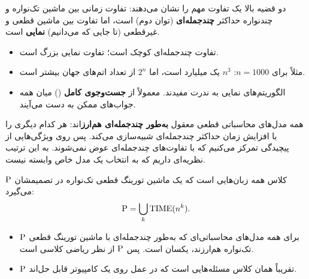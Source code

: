 دو قضیه بالا یک تفاوت مهم را نشان می‌دهند: تفاوت زمانی بین ماشین تک‌نواره و چندنواره حداکثر \textbf{چندجمله‌ای} (توان دوم) است، اما تفاوت بین ماشین قطعی و غیرقطعی (تا جایی که می‌دانیم) \textbf{نمایی} است.

\begin{itemize}
\item تفاوت چندجمله‌ای کوچک است؛ تفاوت نمایی بزرگ است.
\item مثلاً برای $n=1000$: $n^3$ یک میلیارد است، اما $2^n$ از تعداد اتم‌های جهان بیشتر است.
\item الگوریتم‌های نمایی به ندرت مفیدند. معمولاً از \textbf{جست‌وجوی کامل} () میان همه جواب‌های ممکن به دست می‌آیند.
\end{itemize}

همه مدل‌های محاسباتی قطعی معقول \textbf{به‌طور چندجمله‌ای هم‌ارز}اند: هر کدام دیگری را با افزایش زمان حداکثر چندجمله‌ای شبیه‌سازی می‌کند. پس روی ویژگی‌هایی از پیچیدگی تمرکز می‌کنیم که با تفاوت‌های چندجمله‌ای عوض نمی‌شوند. به این ترتیب نظریه‌ای داریم که به انتخاب یک مدل خاص وابسته نیست.

\begin{definition}[کلاس P]
$\mathrm{P}$ کلاس همه زبان‌هایی است که یک ماشین تورینگ قطعی تک‌نواره در  تصمیمشان می‌گیرد:
\[\mathrm{P}=\bigcup_k\mathrm{TIME}(n^k).\]
\end{definition}

\begin{itemize}
\item $\mathrm{P}$ برای همه مدل‌های محاسباتی‌ای که به‌طور چندجمله‌ای با ماشین تورینگ قطعی تک‌نواره هم‌ارزند، یکسان است. پس $\mathrm{P}$ از نظر ریاضی کلاسی  است.
\item $\mathrm{P}$ تقریباً همان کلاس مسئله‌هایی است که در عمل روی یک کامپیوتر قابل حل‌اند.
\end{itemize}

